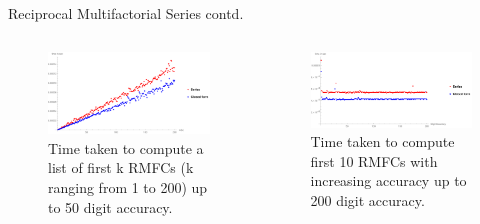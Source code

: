 \documentclass{beamer}
\begin{document}
\begin{frame}{Reciprocal Multifactorial Series contd.}
    \begin{columns}
			\begin{figure}[!hbp]
            \centering
              \includegraphics[width=\linewidth]{Images/first200RMFCseriesvsclosedform.pdf}
                \caption{Time taken to compute a list of first k RMFCs (k ranging from 1 to 200) up to 50 digit accuracy.}
              \label{fig:timecompfirst200rmfcs}
            \end{figure}
			\begin{figure}[!hbp]
             \centering
             \includegraphics[width=\linewidth]{Images/first200digitsaccuracy.pdf}
             \caption{Time taken to compute first 10 RMFCs with increasing accuracy up to 200 digit accuracy.}
              \label{fig:timecomp10rmfc200digit}
            \end{figure}
	\end{columns}
\end{frame}
\end{document}

